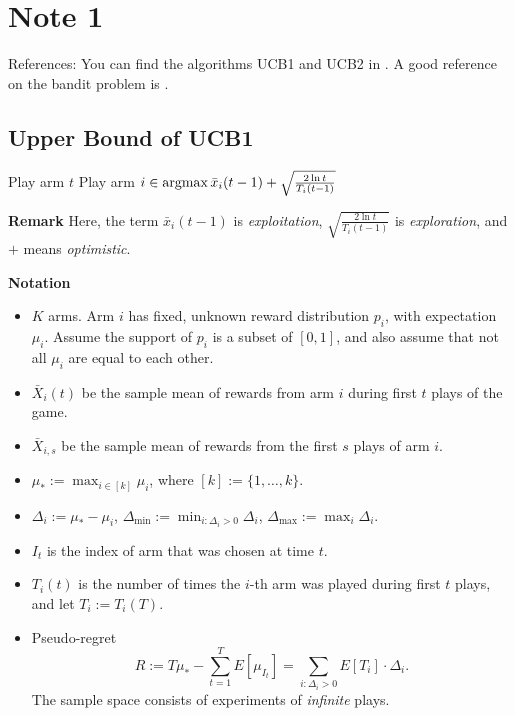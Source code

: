 \section{Note 1}

References: You can find the algorithms UCB1 and UCB2 in \cite{Auer2002}.
A good reference on the bandit problem is \cite{MAL024}.

\subsection{Upper Bound of UCB1} %

\begin{alg}[UCB1] \leavevmode
    \begin{framed}
        \begin{algorithmic}
                \State Play arm $t$
            \EndFor
                \State Play arm $i\in\mathop{\mathrm{argmax}} \bar x_{i}(t-1) + \sqrt{\frac{2\ln t}{T_i(t-1)}}$
            \EndFor
        \end{algorithmic}
    \end{framed}
\end{alg}

\textbf{Remark}
Here,
the term $\bar x_{i}(t-1)$ is \emph{exploitation},
$\sqrt{\frac{2\ln t}{T_i(t-1)}}$ is \emph{exploration},
and $+$ means \emph{optimistic}.

\textbf{Notation}
\begin{itemize}
    \item $K$ arms.
        Arm $i$ has fixed, unknown reward distribution $p_i$,
        with expectation $\mu_i$.
        Assume the support of $p_i$ is a subset of $[0,1]$, and
        also assume that not all $\mu_i$ are equal to each other.
    \item $\bar X_{i}(t)$ be the sample mean of rewards from arm $i$ during first $t$ plays of the game.
    \item $\bar X_{i,s}$ be the sample mean of rewards from the first $s$ plays of arm $i$.
    \item $\mu_*:=\max_{i\in[k]}\mu_i$, where $[k]:=\{1,\dots,k\}$.
    \item $\Delta_i:=\mu_* - \mu_i$,
        $\Delta_{\text{min}}:=\min_{i:\Delta_i>0}\Delta_i$,
        $\Delta_{\text{max}}:=\max_i \Delta_i$.
    \item $I_t$ is the index of arm that was chosen at time $t$.
    \item $T_i(t)$ is the number of times the $i$-th arm was played during first $t$ plays,
        and let $T_i:=T_i(T)$.
    \item Pseudo-regret
        \begin{equation}
            R:=T\mu_*-\sum_{t=1}^T E[\mu_{I_t}]
            = \sum_{i:\Delta_i>0} E[T_i]\cdot\Delta_i.
        \end{equation}
        The sample space consists of experiments of \emph{infinite} plays.
\end{itemize}
\

